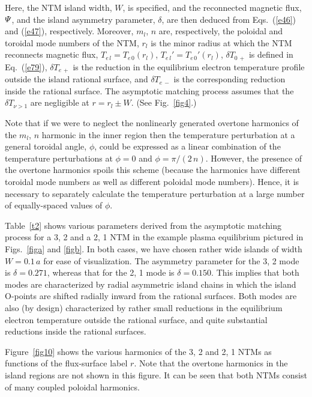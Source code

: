 \documentclass[12pt,prb,aps]{revtex4-1}
\begin{document}
Here, the NTM island width, $W$, is specified, and the reconnected magnetic flux, ${\mit\Psi}$, and the island asymmetry parameter, $\delta$,  are then deduced from Eqs.~(\ref{e46}) and (\ref{e47}), respectively. Moreover,
$m_l$, $n$ are, respectively, the poloidal and toroidal mode numbers of the NTM, $r_l$ is the minor radius at which the NTM reconnects magnetic
flux, $T_{e\,l}=T_{e\,0}(r_l)$, $T_{e\,l}' = T_{e\,0}'(r_l)$, $\delta T_{0\,+}$ is defined in Eq.~(\ref{e79}), $\delta T_{e\,+}$ is the reduction in the equilibrium electron temperature profile outside the
island rational surface, and $\delta T_{e\,-}$ is the corresponding reduction inside the rational surface. The asymptotic matching process assumes that
the $\delta T_{\nu>1}$ are negligible at $r= r_l\pm W$. (See Fig.~\ref{fig4}.)

 Note that if we were to neglect the nonlinearly generated overtone harmonics of the $m_l$, $n$ harmonic in the inner
region then the temperature perturbation at a general toroidal angle, $\phi$, could be expressed as  a linear combination of the temperature perturbations at $\phi=0$ and
$\phi=\pi/(2\,n)$. However, the presence of the overtone harmonics spoils this scheme (because the harmonics have different toroidal mode numbers as
well as different poloidal mode numbers). Hence, it is necessary to separately calculate the temperature perturbation at a large number of equally-spaced values of $\phi$. 

Table~\ref{t2} shows various parameters derived from the asymptotic matching process for a 3, 2 and a 2, 1 NTM in the example plasma equilibrium pictured in Figs.~\ref{figa} and
\ref{figb}. In both cases, we have chosen rather wide islands of width $W=0.1\,a$ for ease of visualization. The asymmetry parameter for the 3, 2 mode is $\delta=0.271$,
whereas that for the 2, 1 mode is $\delta=0.150$. This implies that both modes are characterized by radial asymmetric island chains in which the island O-points are
shifted radially inward from the rational surfaces. Both modes are also (by design) characterized by rather small reductions in the equilibrium electron temperature outside the
rational surface, and quite substantial reductions inside the rational surfaces.

 Figure~\ref{fig10} shows the various harmonics of the 3, 2 and 2, 1 NTMs as functions of the flux-surface
label $r$. Note that
the overtone harmonics in the island regions are not shown in this figure. It can be seen that both NTMs consist of many coupled poloidal harmonics. 
\end{document}
